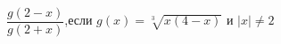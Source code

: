 \begin{ex}[type=calculate_expression]
	\begin{condition}
		\( \dfrac{g(2-x)}{g(2+x)} \),\quad если \( g(x)=\sqrt[3]{x(4-x)} \) и \( |x|\neq2 \)
	\end{condition}
\end{ex}
